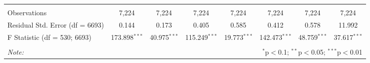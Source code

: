 \begin{table}[!htbp]
\begin{tabular}{@{\extracolsep{5pt}}lccccccc}
\hline \\[-1.8ex] 
Observations & 7,224 & 7,224 & 7,224 & 7,224 & 7,224 & 7,224 & 7,224 \\ 
Residual Std. Error (df = 6693) & 0.144 & 0.173 & 0.405 & 0.585 & 0.412 & 0.578 & 11.992 \\ 
F Statistic (df = 530; 6693) & 173.898$^{***}$ & 40.975$^{***}$ & 115.249$^{***}$ & 19.773$^{***}$ & 142.473$^{***}$ & 48.759$^{***}$ & 37.617$^{***}$ \\ 
\hline 
\hline \\[-1.8ex] 
\textit{Note:}  & \multicolumn{7}{r}{$^{*}$p$<$0.1; $^{**}$p$<$0.05; $^{***}$p$<$0.01} \\ 
\end{tabular} 
\end{table} 
